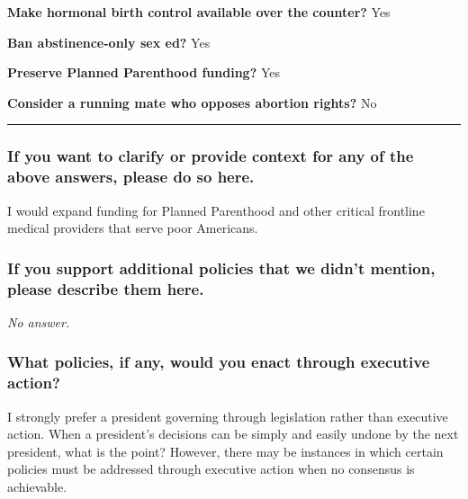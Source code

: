 \textbf{Make hormonal birth control available over the counter?} Yes

\textbf{Ban abstinence-only sex ed?} Yes

\textbf{Preserve Planned Parenthood funding?} Yes

\textbf{Consider a running mate who opposes abortion rights?} No

\begin{center}\rule{0.5\linewidth}{\linethickness}\end{center}

\hypertarget{if-you-want-to-clarify-or-provide-context-for-any-of-the-above-answers-please-do-so-here-5}{%
\subsubsection{If you want to clarify or provide context for any of the
above answers, please do so
here.}\label{if-you-want-to-clarify-or-provide-context-for-any-of-the-above-answers-please-do-so-here-5}}

I would expand funding for Planned Parenthood and other critical
frontline medical providers that serve poor Americans.

\hypertarget{if-you-support-additional-policies-that-we-didnt-mention-please-describe-them-here-5}{%
\subsubsection{If you support additional policies that we didn't
mention, please describe them
here.}\label{if-you-support-additional-policies-that-we-didnt-mention-please-describe-them-here-5}}

\emph{No answer.}

\hypertarget{what-policies-if-any-would-you-enact-through-executive-action-5}{%
\subsubsection{What policies, if any, would you enact through executive
action?}\label{what-policies-if-any-would-you-enact-through-executive-action-5}}

I strongly prefer a president governing through legislation rather than
executive action. When a president's decisions can be simply and easily
undone by the next president, what is the point? However, there may be
instances in which certain policies must be addressed through executive
action when no consensus is achievable.

